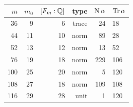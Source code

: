 \begin{center}\begin{tabular}{rrrrrl}\toprule $m$ & $m_0$ & $[F_m:\mathbb{Q}]$ & type & $\operatorname{N}\alpha$ & $\operatorname{Tr}\alpha$\\\midrule
36 & 9 & 6 & trace & 24 & 18\\
44 & 11 & 10 & norm & 89 & 28\\
52 & 13 & 12 & norm & 13 & 52\\
76 & 19 & 18 & norm & 229 & 106\\
100 & 25 & 20 & norm & 5 & 120\\
108 & 27 & 18 & norm & 109 & 108\\
116 & 29 & 28 & unit & 1 & 120\\
\bottomrule\end{tabular}\end{center}
